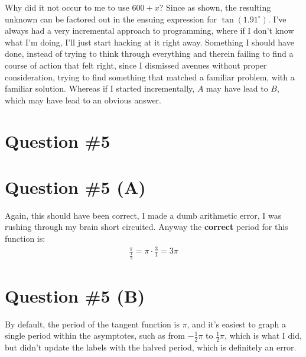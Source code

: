 Why did it not occur to me to use $600 + x$? Since as shown, the resulting unknown can be factored out in the ensuing expression for $\tan(1.91^\circ)$. I've always had a very incremental approach to programming, where if I don't know what I'm doing, I'll just start hacking at it right away. Something I should have done, instead of trying to think through everything and therein failing to find a course of action that felt right, since I dismissed avenues without proper consideration, trying to find something that matched a familiar problem, with a familiar solution. Whereas if I started incrementally, $A$ may have lead to $B$, which may have lead to an obvious answer. 






\section*{Question \#5}

\section*{Question \#5 (A)}

Again, this should have been correct, I made a dumb arithmetic error, I was rushing through my brain short circuited. Anyway the \textbf{correct} period for this function is:
\begin{equation}
\begin{split}
\frac{\pi}{\frac{1}{3}} = \pi \cdot \frac{3}{1} = 3\pi
\end{split}
\end{equation}

\answer{$3\pi$}

\newpage
\section*{Question \#5 (B)}

By default, the period of the tangent function is $\pi$, and it's easiest to graph a single period within the asymptotes, such as from $-\frac{1}{2}\pi$ to $\frac{1}{2}\pi$, which is what I did, but didn't update the labels with the halved period, which is definitely an error. 




